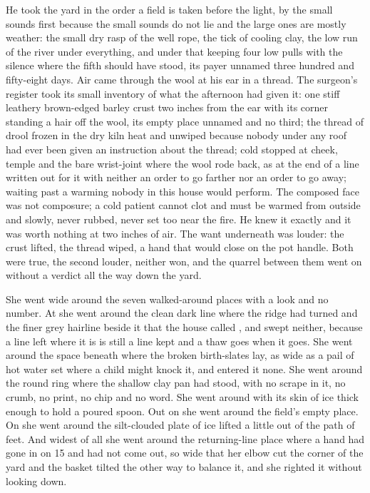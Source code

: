 He took the yard in the order a field is taken before the light, by the small sounds first because the small sounds do not lie and the large ones are mostly weather: the small dry rasp of the well rope, the tick of cooling clay, the low run of the river under everything, and under that  keeping four low pulls with the silence where the fifth should have stood, its payer unnamed three hundred and fifty-eight days. Air came through the wool at his ear in a thread. The surgeon's register took its small inventory of what the afternoon had given it: one stiff leathery brown-edged barley crust two inches from the ear with its corner standing a hair off the wool, its empty place unnamed and no third; the thread of drool frozen in the dry kiln heat and unwiped because nobody under any roof had ever been given an instruction about the thread; cold stopped at cheek, temple and the bare wrist-joint where the wool rode back, as at the end of a line written out for it with neither an order to go farther nor an order to go away;  waiting past a warming nobody in this house would perform. The composed face was not composure; a cold patient cannot clot and must be warmed from outside and slowly, never rubbed, never set too near the fire. He knew it exactly and it was worth nothing at two inches of air. The want underneath was louder: the crust lifted, the thread wiped, a hand that would close on the pot handle. Both were true, the second louder, neither won, and the quarrel between them went on without a verdict all the way down the yard.

She went wide around the seven walked-around places with a look and no number. At  she went around the clean dark line where the ridge had turned and the finer grey hairline beside it that the house called , and swept neither, because a line left where it is is still a line kept and a thaw goes when it goes. She went around the space beneath  where the broken birth-slates lay, as wide as a pail of hot water set where a child might knock it, and entered it none. She went around the round ring where the shallow clay pan had stood, with no scrape in it, no crumb, no print, no chip and no word. She went around  with its skin of ice thick enough to hold a poured spoon. Out on  she went around the field's empty place. On  she went around the silt-clouded plate of ice lifted a little out of the path of feet. And widest of all she went around the returning-line place where a hand had gone in on  15 and had not come out, so wide that her elbow cut the corner of the yard and the basket tilted the other way to balance it, and she righted it without looking down.


